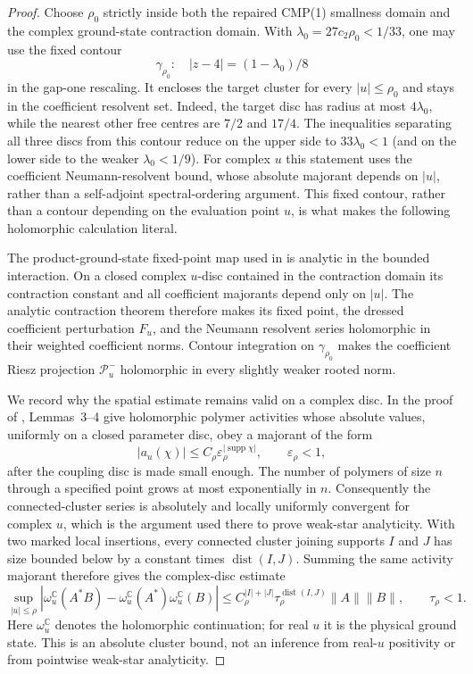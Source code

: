 \begin{proof}
Choose $\rho_0$ strictly inside both the repaired CMP(1) smallness domain and
the complex ground-state contraction domain.  With
$\lambda_0=27c_2\rho_0<1/33$, one may use the fixed contour
\[
 \gamma_{\rho_0}:\quad |z-4|=(1-\lambda_0)/8
\]
in the gap-one rescaling.  It encloses the target cluster for every
$|u|\le\rho_0$ and stays in the coefficient resolvent set.  Indeed, the
target disc has radius at most $4\lambda_0$, while the nearest other free
centres are $7/2$ and $17/4$.  The inequalities separating all three discs
from this contour reduce on the upper side to
$33\lambda_0<1$ (and on the lower side to the weaker
$\lambda_0<1/9$).  For complex $u$ this statement uses the coefficient
Neumann-resolvent bound, whose absolute majorant depends on $|u|$, rather
than a self-adjoint spectral-ordering argument.  This fixed contour, rather
than a contour depending on the evaluation point $u$, is what makes the
following holomorphic calculation literal.

The product-ground-state fixed-point map used in
\cite{Yarotsky2004QP} is analytic in the bounded interaction.  On a closed
complex $u$-disc contained in the contraction domain its contraction
constant and all coefficient majorants depend only on $|u|$.  The analytic
contraction theorem therefore makes its fixed point, the dressed coefficient
perturbation $F_u$, and the Neumann resolvent series holomorphic in their
weighted coefficient norms.  Contour integration on $\gamma_{\rho_0}$ makes
the coefficient Riesz projection $\mathcal P_u^-$ holomorphic in every
slightly weaker rooted norm.

We record why the spatial estimate remains valid on a complex disc.  In the
proof of \cite[Theorem~1]{Yarotsky2006GroundStates}, Lemmas~3--4 give
holomorphic polymer activities whose absolute values, uniformly on a closed
parameter disc, obey a majorant of the form
\[
 |a_u(\chi)|\le C_\rho\varepsilon_\rho^{|\operatorname{supp}\chi|},
 \qquad \varepsilon_\rho<1,
\]
after the coupling disc is made small enough.  The number of polymers of
size $n$ through a specified point grows at most exponentially in $n$.
Consequently the connected-cluster series is absolutely and locally
uniformly convergent for complex $u$, which is the argument used there to
prove weak-star analyticity.  With two marked local insertions, every
connected cluster joining supports $I$ and $J$ has size bounded below by a
constant times $\operatorname{dist}(I,J)$.  Summing the same activity
majorant therefore gives the complex-disc estimate
\begin{equation}
 \sup_{|u|\le\rho}
 |\omega_u^{\mathbb C}(A^*B)
   -\omega_u^{\mathbb C}(A^*)\omega_u^{\mathbb C}(B)|
 \le C_\rho^{|I|+|J|}\tau_\rho^{\operatorname{dist}(I,J)}
       \|A\|\|B\|,
 \qquad \tau_\rho<1.
 \label{eq:g18-complex-cluster-majorant}
\end{equation}
Here $\omega_u^{\mathbb C}$ denotes the holomorphic continuation; for real
$u$ it is the physical ground state.  This is an absolute cluster bound, not
an inference from real-$u$ positivity or from pointwise weak-star
analyticity.


\end{proof}

